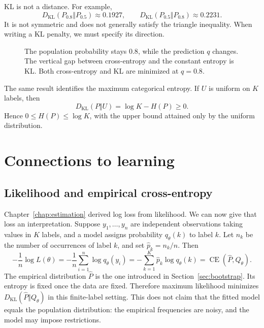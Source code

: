 KL is not a distance. For example,
\[
  D_{\mathrm{KL}}(P_{0.8}\Vert P_{0.5})\approx0.1927,\qquad
  D_{\mathrm{KL}}(P_{0.5}\Vert P_{0.8})\approx0.2231.
\]
It is not symmetric and does not generally satisfy the triangle inequality.
When writing a KL penalty, we must specify its direction.

\begin{figure}[H]
  \centering\InfoCrossEntropyPlot
  \caption{The population probability stays \(0.8\), while the prediction
  \(q\) changes. The vertical gap between cross-entropy and the constant
  entropy is KL. Both cross-entropy and KL are minimized at \(q=0.8\).}
  \label{fig:cross-entropy-kl}
\end{figure}

The same result identifies the maximum categorical entropy. If \(U\)
is uniform on \(K\) labels, then
\[
  D_{\mathrm{KL}}(P\Vert U)=\log K-H(P)\ge0.
\]
Hence \(0\le H(P)\le\log K\), with the upper bound attained only by the
uniform distribution.

\section{Connections to learning}
\label{sec:information-learning}

\subsection{Likelihood and empirical cross-entropy}

Chapter~\ref{chap:estimation} derived log loss from likelihood.
We can now give that loss an interpretation. Suppose \(y_1,\ldots,y_n\)
are independent observations taking values in \(K\) labels, and a model
assigns probability \(q_\theta(k)\) to label \(k\). Let \(n_k\) be the
number of occurrences of label \(k\), and set \(\widehat p_k=n_k/n\).
Then
\begin{equation}
  -\frac1n\log L(\theta)
  =-\frac1n\sum_{i=1}^n\log q_\theta(y_i)
  =-\sum_{k=1}^K\widehat p_k\log q_\theta(k)
  =\operatorname{CE}(\widehat P,Q_\theta).
  \label{eq:mle-empirical-ce}
\end{equation}
The empirical distribution \(\widehat P\) is the one introduced in
Section~\ref{sec:bootstrap}. Its entropy is fixed once the data are fixed.
Therefore maximum likelihood minimizes
\(D_{\mathrm{KL}}(\widehat P\Vert Q_\theta)\) in this finite-label setting.
This does not claim that the fitted model equals the population distribution:
the empirical frequencies are noisy, and the model may impose restrictions.

